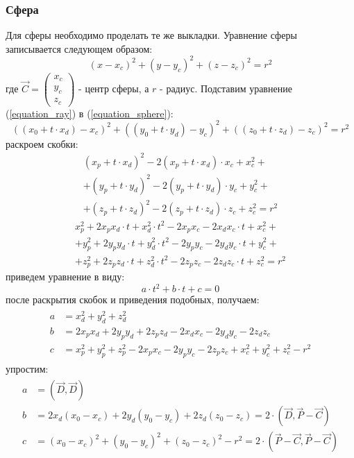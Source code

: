 \documentclass[12pt, a4paper, utf8]{article}
\def\VECXYZ#1{\left( \begin{array}{c} x_#1 \\ y_#1 \\ z_#1 \end{array} \right) }
\begin{document}
\subsubsection{Сфера}
Для сферы необходимо проделать те же выкладки.
Уравнение сферы записывается следующем образом:
\begin{equation}
(x-x_c)^2 + (y-y_c)^2 + (z-z_c)^2 = r^2
\label{equation_sphere}
\end{equation}
где $\vec{C} = \VECXYZ{c}$ - центр сферы, а $r$ - радиус. Подставим уравнение (\ref{equation_ray}) в (\ref{equation_sphere}):
$$
\left( (x_0 + t \cdot x_d) - x_c \right)^2 + 
\left( (y_0 + t \cdot y_d) - y_c \right)^2 + 
\left( (z_0 + t \cdot z_d) - z_c \right)^2 = r^2
$$
раскроем скобки:
\begin{multline*}
(x_p + t \cdot x_d)^2 - 2(x_p + t \cdot x_d)\cdot x_c + x_c^2 + \\
 + (y_p + t \cdot y_d)^2 - 2(y_p + t \cdot y_d)\cdot y_c + y_c^2 + \\
 + (z_p + t \cdot z_d)^2 - 2(z_p + t \cdot z_d)\cdot z_c + z_c^2 = r^2
\end{multline*}
\begin{multline*}
x^2_p + 2x_px_d\cdot t + x_d^2 \cdot t^2 - 2 x_px_c - 2 x_dx_c \cdot t + x_c^2 + \\
 + y^2_p + 2y_py_d\cdot t + y_d^2 \cdot t^2 - 2 y_py_c - 2 y_dy_c \cdot t + y_c^2 + \\
 + z^2_p + 2z_pz_d\cdot t + z_d^2 \cdot t^2 - 2 z_pz_c - 2 z_dz_c \cdot t + z_c^2 = r^2
\end{multline*}
приведем уравнение в виду:
\begin{equation}
a \cdot t^2 + b \cdot t + c = 0
\label{equation_square}
\end{equation}
после раскрытия скобок и приведения подобных, получаем:
\begin{eqnarray*}
\begin{split}
a &= x^2_d + y^2_d + z^2_d \\
b &= 2x_px_d + 2 y_py_d + 2z_pz_d - 2x_dx_c - 2y_dy_c - 2z_dz_c \\
c &= x_p^2 + y_p^2 + z_p^2 - 2x_px_c - 2y_py_c - 2z_pz_c + x_c^2 + y_c^2 + z_c^2 - r^2 \end{split}
\end{eqnarray*}
упростим:
\begin{eqnarray*}
\begin{split}
a &= (\vec{D}, \vec{D}) \\
b &= 2x_d(x_0 - x_c) + 2y_d(y_0 - y_c) + 2z_d(z_0 - z_c) = 2 \cdot (\vec{D}, \vec{P}-\vec{C}) \\
c &= (x_0 - x_c)^2 + (y_0 - y_c)^2 + (z_0 - z_c)^2  - r^2 = 2 \cdot (\vec{P}-\vec{C},\vec{P}-\vec{C})
\end{split}
\end{eqnarray*}
\end{document}

